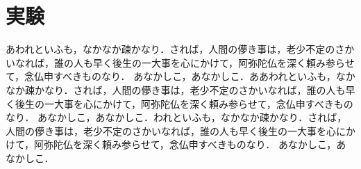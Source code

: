 

\chapter{実験}
あわれといふも，なかなか疎かなり．されば，人間の儚き事は，老少不定のさかいなれば，誰の人も早く後生の一大事を心にかけて，阿弥陀仏を深く頼み参らせて，念仏申すべきものなり． あなかしこ，あなかしこ．ああわれといふも，なかなか疎かなり．されば，人間の儚き事は，老少不定のさかいなれば，誰の人も早く後生の一大事を心にかけて，阿弥陀仏を深く頼み参らせて，念仏申すべきものなり． あなかしこ，あなかしこ．われといふも，なかなか疎かなり．されば，人間の儚き事は，老少不定のさかいなれば，誰の人も早く後生の一大事を心にかけて，阿弥陀仏を深く頼み参らせて，念仏申すべきものなり． あなかしこ，あなかしこ．
